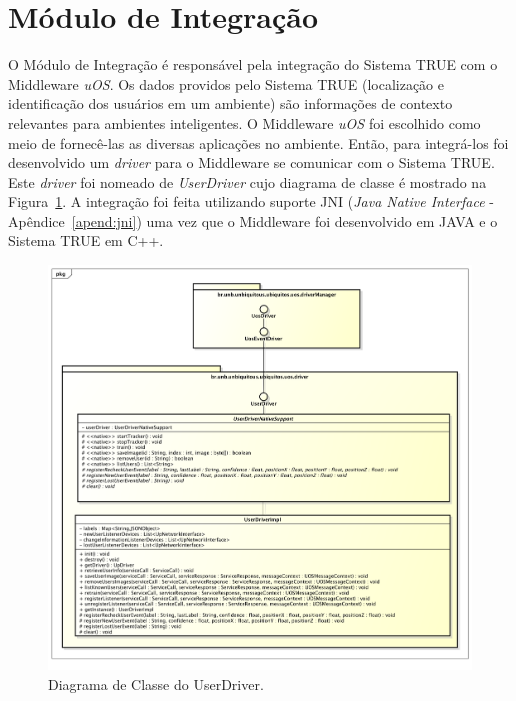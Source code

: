 \section{Módulo de Integração}

	O Módulo de Integração é responsável pela integração do Sistema TRUE  com o
	Middleware \textit{uOS}. Os dados providos pelo Sistema TRUE (localização
	e identificação dos usuários em um ambiente) são informações de
	contexto relevantes para ambientes inteligentes. O Middleware \textit{uOS} foi
	escolhido como meio de fornecê-las as diversas aplicações no ambiente. Então,
	para integrá-los foi desenvolvido um \textit{driver} para o Middleware se comunicar
	com o Sistema TRUE. Este \textit{driver} foi nomeado de \textit{UserDriver} cujo diagrama de classe
	é mostrado na Figura~\ref{fig:userdriver}. A integração foi feita utilizando
	suporte JNI (\textit{Java Native Interface} - Apêndice~\ref{apend:jni}) uma vez que o Middleware foi desenvolvido em JAVA e o Sistema TRUE em C++.

	\begin{figure}[htb]
		\begin{center}
			\includegraphics[scale=0.45]{figuras/4.ProblemaEProposta/diagrama-classe-userdriver.png}
		\end{center}
		\caption{Diagrama de Classe do UserDriver.}
		\label{fig:userdriver}
	\end{figure}

